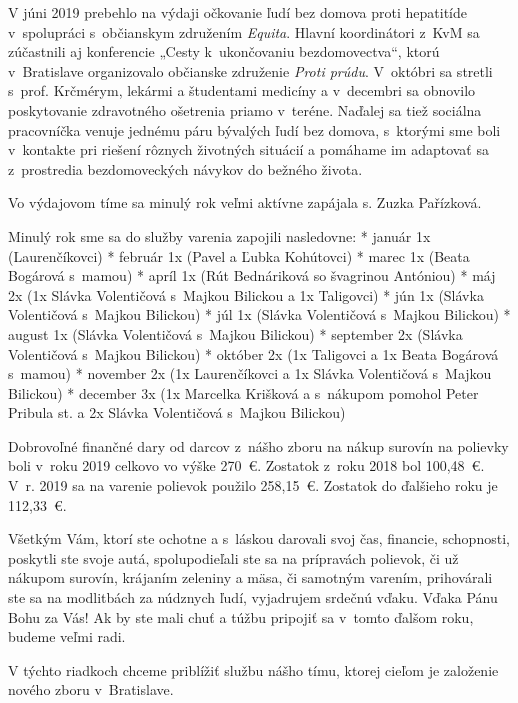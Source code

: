 V júni 2019 prebehlo na výdaji očkovanie ľudí bez domova proti hepatitíde v~spolupráci s~občianskym združením {\it Equita}. Hlavní koordinátori z~KvM sa zúčastnili aj konferencie „Cesty k~ukončovaniu bezdomovectva“, ktorú v~Bratislave organizovalo občianske združenie {\it Proti prúdu}. V~októbri sa stretli s~prof. Krčmérym, lekármi a študentami medicíny a v~decembri sa obnovilo poskytovanie zdravotného ošetrenia priamo v~teréne. Naďalej sa tiež sociálna pracovníčka venuje jednému páru bývalých ľudí bez domova, s~ktorými sme boli v~kontakte pri riešení rôznych životných situácií a pomáhame im adaptovať sa z~prostredia bezdomoveckých návykov do bežného života.

Vo výdajovom tíme sa minulý rok veľmi aktívne zapájala s. Zuzka Pařízková.

Minulý rok sme sa do služby varenia zapojili nasledovne:
\begitems
* január 1x (Laurenčíkovci)
* február 1x (Pavel a Ľubka Kohútovci)
* marec 1x (Beata Bogárová s~mamou)
* apríl 1x (Rút Bednáriková so švagrinou Antóniou)
* máj 2x (1x Slávka Volentičová s~Majkou Bilickou a 1x Taligovci)
* jún 1x (Slávka Volentičová s~Majkou Bilickou)
* júl 1x (Slávka Volentičová s~Majkou Bilickou)
* august 1x (Slávka Volentičová s~Majkou Bilickou)
* september 2x (Slávka Volentičová s~Majkou Bilickou)
* október 2x (1x Taligovci a 1x Beata Bogárová s~mamou)
* november 2x (1x Laurenčíkovci a 1x Slávka Volentičová s~Majkou Bilickou)
* december 3x (1x Marcelka Krišková a s~nákupom pomohol Peter Pribula st. a 2x Slávka Volentičová s~Majkou Bilickou)
\enditems

Dobrovoľné finančné dary od darcov z~nášho zboru na nákup surovín na polievky boli v~roku 2019 celkovo vo výške 270~€. Zostatok z~roku 2018 bol 100,48~€. V~r. 2019 sa na varenie polievok použilo 258,15~€. Zostatok do ďalšieho roku je 112,33~€.

Všetkým Vám, ktorí ste ochotne a s~láskou darovali svoj čas, financie, schopnosti, poskytli ste svoje autá, spolupodieľali ste sa na prípravách polievok, či už nákupom surovín, krájaním zeleniny a mäsa, či samotným varením, prihovárali ste sa na modlitbách za núdznych ľudí, vyjadrujem srdečnú vďaku. Vďaka Pánu Bohu za Vás! Ak by ste mali chuť a túžbu pripojiť sa v~tomto ďalšom roku, budeme veľmi radi.

\vfill\break




V týchto riadkoch chceme priblížiť službu nášho tímu, ktorej cieľom je založenie nového zboru v~Bratislave.

